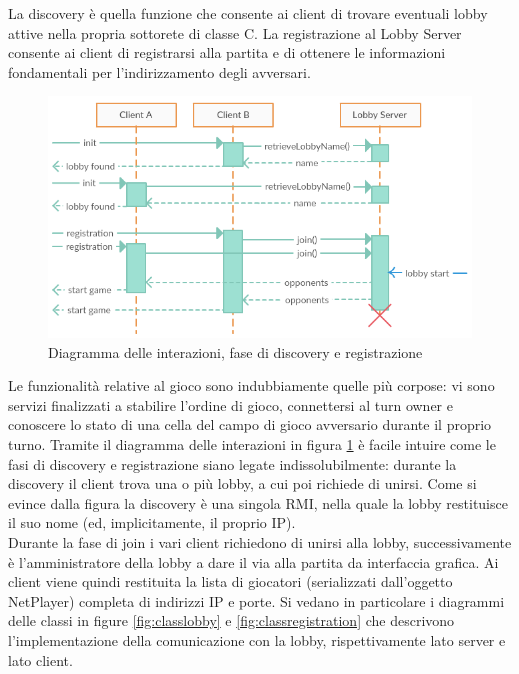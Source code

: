 La discovery è quella funzione che consente ai client di trovare eventuali 
lobby attive nella propria sottorete di classe C. La registrazione al Lobby 
Server consente ai client di registrarsi alla partita e di ottenere le 
informazioni fondamentali per l'indirizzamento degli avversari.
\begin{figure}[!ht]
    \centering
    \includegraphics[scale=0.60,center]{core/imgs/UML/sequence/discovery.png}
    \caption{Diagramma delle interazioni, fase di discovery e registrazione}
    \label{fig:discoveryseq}
\end{figure}Le funzionalità 
relative al gioco sono indubbiamente quelle più corpose: vi sono servizi 
finalizzati a stabilire l'ordine di gioco, connettersi al turn owner e 
conoscere lo stato di una cella del campo di gioco avversario durante il 
proprio turno. Tramite il diagramma delle interazioni in figura \ref{fig:discoveryseq} 
è facile intuire come le fasi di discovery e registrazione siano legate 
indissolubilmente: durante la discovery il client trova una o più lobby, a cui 
poi richiede di unirsi. Come si evince dalla figura la discovery è una singola 
RMI, nella quale la lobby restituisce il suo nome (ed, implicitamente, il 
proprio IP). 
\\
Durante la fase di join i vari client richiedono di unirsi alla 
lobby, successivamente è l'amministratore della lobby a dare il via alla 
partita da interfaccia grafica. Ai client viene quindi restituita la lista di 
giocatori (serializzati dall'oggetto NetPlayer) completa di indirizzi IP e 
porte. Si vedano in particolare i diagrammi delle classi in figure \ref{fig:classlobby}
e \ref{fig:classregistration} che descrivono l'implementazione della comunicazione con la lobby,
rispettivamente lato server e lato client.

